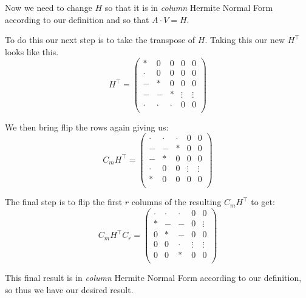 \documentclass[oneside, a4paper, onecolumn, 11pt]{article}
\begin{document}
Now we need to change \(H\) so that it is in \textit{column} Hermite Normal Form according to our definition and so that \(A \cdot V = H\).

To do this our next step is to take the transpose of \(H\). Taking this our new \(H^\intercal\) looks like this.
\[
    H^\intercal = \left(
    \begin{array}{ccccc}
            *     & 0     & 0     & 0      & 0      \\
            \cdot & 0     & 0     & 0      & 0      \\
            -     & *     & 0     & 0      & 0      \\
            -     & -     & *     & \vdots & \vdots \\
            \cdot & \cdot & \cdot & 0      & 0      \\
        \end{array}
    \right)
\]

We then bring flip the rows again giving us:
\[
    C_m H^\intercal = \left(
    \begin{array}{ccccc}
            \cdot & \cdot & \cdot & 0      & 0      \\
            -     & -     & *     & 0      & 0      \\
            -     & *     & 0     & 0      & 0      \\
            \cdot & 0     & 0     & \vdots & \vdots \\
            *     & 0     & 0     & 0      & 0      \\
        \end{array}
    \right)
\]

The final step is to flip the first \(r\) columns of the resulting \(C_m H^\intercal\) to get:
\[
    C_m H^\intercal C_r = \left(
    \begin{array}{ccccc}
            \cdot & \cdot & \cdot & 0      & 0      \\
            *     & -     & -     & 0      & \vdots \\
            0     & *     & -     & 0      & 0      \\
            0     & 0     & \cdot & \vdots & \vdots \\
            0     & 0     & *     & 0      & 0      \\
        \end{array}
    \right)
\]

This final result is in \textit{column} Hermite Normal Form according to our definition, so thus we have our desired result.
\end{document}
